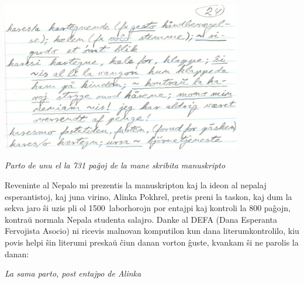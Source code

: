 \begin{center}
	\includegraphics[width=10.5cm]{origino.png}
	
	{\frenchspacing\itshape
	Parto de unu el la 731 pa\^goj de la mane skribita manuskripto}
	
\end{center}


{\frenchspacing
Reveninte al Nepalo mi prezentis la manuskripton kaj la ideon al nepalaj
esperantistoj, kaj juna virino, Alinka Pokhrel, pretis preni la taskon,
kaj dum la sekva jaro \^si uzis pli ol 1500~laborhorojn por entajpi kaj
kontroli la 800 pa\^gojn, kontra\u{u} normala Nepala studenta salajro.
Danke al DEFA (Dana Esperanta Fervojista Asocio) ni ricevis malnovan
komputilon kun dana literumkontrolilo, kiu povis helpi \^sin literumi
preska\u{u} \^ciun danan vorton \^guste, kvankam \^si ne parolis la
danan:}


\begin{center}

{\itshape La sama parto, post entajpo de Alinka}
\end{center}





